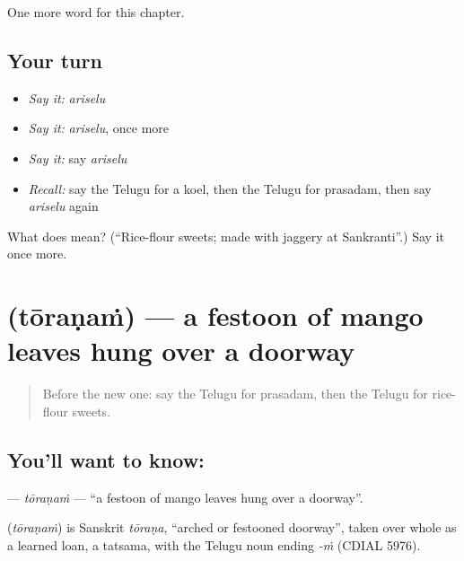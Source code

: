 \begin{grammarlens}[title={What you've built}]
One more word for this chapter.
\end{grammarlens}

\subsection*{Your turn}
\begin{itemize}
\raggedright
  \item \emph{Say it:} \emph{ariselu}
  \item \emph{Say it:} \emph{ariselu}, once more
  \item \emph{Say it:} say \emph{ariselu}
  \item \emph{Recall:} say the Telugu for a koel, then the Telugu for prasadam, then say \emph{ariselu} again
\end{itemize}

\begin{tcolorbox}[breakable,colback=teal!4,colframe=teal!35!black,title={Before you move on}]
What does  mean? (\textquotedblleft{}Rice-flour sweets; made with jaggery at Sankranti\textquotedblright{}.) Say it once more.
\end{tcolorbox}
\section[\texorpdfstring{\te{తోరణం} (tōraṇaṁ)}{తోరణం (tōraṇaṁ)}]{ (tōraṇaṁ) — a festoon of mango leaves hung over a doorway}

\label{lesson:TE-C188-toranam}



\begin{quote}
Before the new one: say the Telugu for prasadam, then the Telugu for rice-flour sweets.
\end{quote}

\subsection*{You'll want to know: }
\textbf{} — \emph{tōraṇaṁ} — \textquotedblleft{}a festoon of mango leaves hung over a doorway\textquotedblright{}.

\begin{cousinweb}
\textbf{} (\emph{tōraṇaṁ}) is Sanskrit \emph{tōraṇa}, \textquotedblleft{}arched or festooned doorway\textquotedblright{}, taken over whole as a learned loan, a tatsama, with the Telugu noun ending \emph{-ṁ} (CDIAL 5976).
\end{cousinweb}

